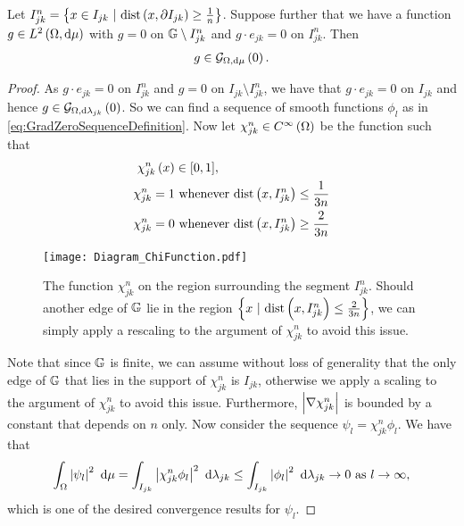 \begin{lemma} \label{lem:SegGradExtend}
	Let $I_{jk}^{n} = \clbracs{x\in I_{jk} \ \vert \ \mathrm{dist}\bracs{x, \partial I_{jk}}\geq\recip{n}}$.
	Suppose further that we have a function $g\in L^{2}\left( \Omega,\mathrm{d}\mu \right)$ with $g=0$ on $\mathbb{G}\setminus I_{jk}^{n}$ and $g\cdot e_{jk}=0$ on $I_{jk}^{n}$.
	Then 
	\begin{align*}
		g\in\mathcal{G}_{ \Omega, \mathrm{d}\mu}\left( 0 \right).
	\end{align*}
\end{lemma}
\begin{proof}
	As $g\cdot e_{jk}=0$ on $I_{jk}^{n}$ and $g=0$ on $I_{jk}\setminus I_{jk}^{n}$, we have that $g\cdot e_{jk}=0$ on $I_{jk}$ and hence $g\in\mathcal{G}_{ \Omega, \mathrm{d}\lambda_{jk}}\left( 0 \right)$.
	So we can find a sequence of smooth functions $\phi_l$ as in \eqref{eq:GradZeroSequenceDefinition}.
	Now let $\chi_{jk}^{n}\in C^{\infty}\left( \Omega \right)$ be the function such that
	\begin{align*}
		\chi_{jk}^{n}\left( x \right) &\in [0,1], \\
		\chi_{jk}^{n} = 1 &\text{ whenever } \mathrm{dist}\left( x, I_{jk}^n \right)\leq \frac{1}{3n} \\
		\chi_{jk}^{n} = 0 &\text{ whenever } \mathrm{dist}\left( x, I_{jk}^n \right)\geq \frac{2}{3n}
	\end{align*}
	\begin{figure}
		\centering
		\texttt{[image: Diagram\_ChiFunction.pdf]}
		\caption{\label{fig:chiDiagram} The function $\chi_{jk}^n$ on the region surrounding the segment $I_{jk}^n$. Should another edge of $\mathbb{G}$ lie in the region $\clbracs{x \ \vert \ \mathrm{dist}\bracs{x,I_{jk}^{n}}\leq\frac{2}{3n}}$, we can simply apply a rescaling to the argument of $\chi_{jk}^n$ to avoid this issue.}
	\end{figure}
	Note that since $\mathbb{G}$ is finite, we can assume without loss of generality that the only edge of $\mathbb{G}$ that lies in the support of $\chi_{jk}^n$ is $I_{jk}$, otherwise we apply a scaling to the argument of $\chi_{jk}^n$ to avoid this issue.
	Furthermore, $\left\lvert \nabla\chi_{jk}^{n} \right\rvert$ is bounded by a constant that depends on $n$ only.
	Now consider the sequence $\psi_l = \chi_{jk}^{n}\phi_l$.
	We have that
	\begin{align*}
		\int_{\Omega}\left\lvert \psi_l \right\rvert^2 \ \mathrm{d}\mu = \int_{I_{jk}}\left\lvert \chi_{jk}^{n}\phi_l \right\rvert^2 \ \mathrm{d}\lambda_{jk}
		\leq \int_{I_{jk}}\left\lvert \phi_l \right\rvert^2 \ \mathrm{d}\lambda_{jk} \rightarrow0 \ \text{as} \ l \rightarrow\infty,
	\end{align*}
	which is one of the desired convergence results for $\psi_l$.

\end{proof}
